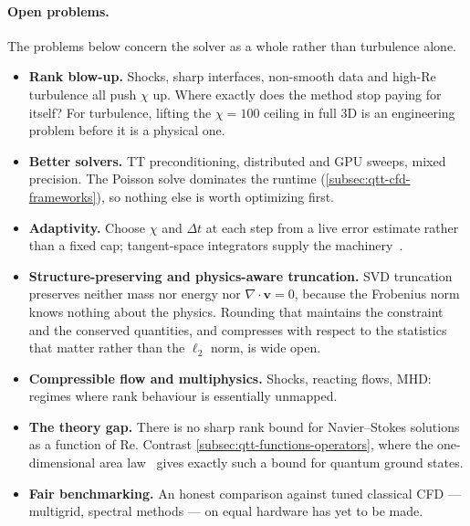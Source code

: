 \paragraph{Open problems.}
The problems below concern the solver as a whole rather than turbulence alone.
\begin{itemize}
  \item \textbf{Rank blow-up.} Shocks, sharp interfaces, non-smooth data and
    high-$\mathrm{Re}$ turbulence all push $\chi$ up. Where exactly does the
    method stop paying for itself? For turbulence, lifting the $\chi = 100$
    ceiling in full 3D is an engineering problem before it is a physical one.
  \item \textbf{Better solvers.} TT preconditioning, distributed and GPU sweeps,
    mixed precision. The Poisson solve dominates the runtime
    (\cref{subsec:qtt-cfd-frameworks}), so nothing else is worth optimizing
    first.
  \item \textbf{Adaptivity.} Choose $\chi$ and $\Delta t$ at each step from a
    live error estimate rather than a fixed cap; tangent-space integrators
    supply the machinery~\cite{Lubich2015}.
  \item \textbf{Structure-preserving and physics-aware truncation.} SVD
    truncation preserves neither mass nor energy nor $\nabla\cdot\mathbf{v} =
    0$, because the Frobenius norm knows nothing about the physics. Rounding
    that maintains the constraint and the conserved quantities, and compresses
    with respect to the statistics that matter rather than the $\ell_2$ norm, is
    wide open.
  \item \textbf{Compressible flow and multiphysics.} Shocks, reacting flows,
    MHD: regimes where rank behaviour is essentially unmapped.
  \item \textbf{The theory gap.} There is no sharp rank bound for Navier--Stokes
    solutions as a function of $\mathrm{Re}$. Contrast \cref{subsec:qtt-functions-operators}, where
    the one-dimensional area law~\cite{Hastings2007} gives exactly such a bound
    for quantum ground states.
  \item \textbf{Fair benchmarking.} An honest comparison against tuned classical
    CFD --- multigrid, spectral methods --- on equal hardware has yet to be made.
\end{itemize}

